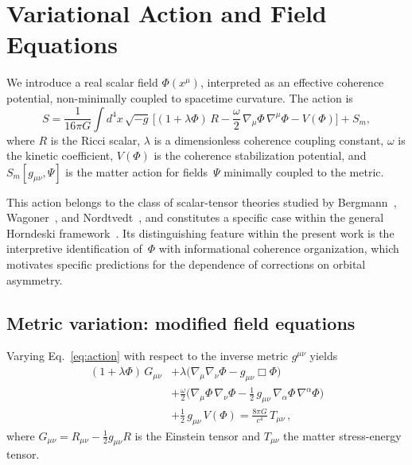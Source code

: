 \documentclass[showpacs,preprintnumbers,amsmath,amssymb,prd,longbibliography]{revtex4-2}
\begin{document}
\section{Variational Action and Field Equations}
\label{sec:action}

We introduce a real scalar field $\Phi(x^\mu)$, interpreted as
an effective coherence potential, non-minimally coupled to
spacetime curvature.
The action is
\begin{equation}
S = \frac{1}{16\pi G}\int d^4x\,\sqrt{-g}\,
\Big[(1+\lambda\Phi)\,R
- \frac{\omega}{2}\,\nabla_\mu\Phi\,\nabla^\mu\Phi
- V(\Phi)\Big]
+ S_m,
\label{eq:action}
\end{equation}
where $R$ is the Ricci scalar,
$\lambda$ is a dimensionless coherence coupling constant,
$\omega$ is the kinetic coefficient,
$V(\Phi)$ is the coherence stabilization potential,
and $S_m[g_{\mu\nu},\Psi]$ is the matter action for fields~$\Psi$
minimally coupled to the metric.

This action belongs to the class of scalar-tensor theories
studied by Bergmann~\cite{Bergmann1968},
Wagoner~\cite{Wagoner1970}, and Nordtvedt~\cite{Nordtvedt1970},
and constitutes a specific case within the general Horndeski
framework~\cite{Horndeski1974}.
Its distinguishing feature within the present work is the
interpretive identification of~$\Phi$ with informational
coherence organization, which motivates specific predictions
for the dependence of corrections on orbital asymmetry.

\subsection{Metric variation: modified field equations}

Varying Eq.~\eqref{eq:action} with respect to the inverse
metric $g^{\mu\nu}$ yields
\begin{align}
(1+\lambda\Phi)\,G_{\mu\nu}
&+ \lambda\big(\nabla_\mu\nabla_\nu\Phi - g_{\mu\nu}\Box\Phi\big)
\nonumber\\
&+ \frac{\omega}{2}\Big(\nabla_\mu\Phi\,\nabla_\nu\Phi
- \frac{1}{2}\,g_{\mu\nu}\,\nabla_\alpha\Phi\,\nabla^\alpha\Phi\Big)
\nonumber\\
&+ \frac{1}{2}\,g_{\mu\nu}\,V(\Phi)
= \frac{8\pi G}{c^4}\,T_{\mu\nu}\,,
\label{eq:full-field}
\end{align}
where $G_{\mu\nu} = R_{\mu\nu} - \tfrac{1}{2}g_{\mu\nu}R$ is
the Einstein tensor and $T_{\mu\nu}$ the matter stress-energy tensor.
\end{document}
